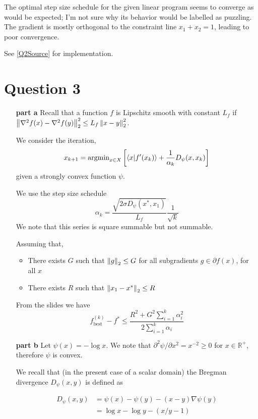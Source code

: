 \documentclass{article}
\begin{document}
The optimal step size schedule for the given linear
program seems to converge as would be expected; I'm not sure why its
behavior would be labelled as puzzling. The gradient is mostly
orthogonal to the constraint line $x_1 + x_2 = 1$, leading to poor
convergence.

See \ref{Q2Source} for implementation.

\section{Question 3}

\begin{enumerate}
\item[\bf part a]
  Recall that a function $f$ is Lipschitz smooth with constant $L_f$
  if $\left\lVert \nabla^2 f(x) - \nabla^2 f(y) \right\rVert_2^2 \le L_f \left\lVert x-y \right\rVert_2^2$.

  We consider the iteration,
  \[ x_{k+1} = \mathrm{argmin}_{x \in X} \left[ \braket{x \vert f'(x_k)} + \frac{1}{\alpha_k}
      D_\psi(x, x_k) \right] \]
  given a strongly convex function $\psi$.

  We use the step size schedule
  \[ \alpha_k = \frac{\sqrt{2 \sigma D_\psi(x^*, x_1)}}{L_f} \frac{1}{\sqrt k} \]
  We note that this series is square summable but not summable.

  Assuming that,

  \begin{itemize}
  \item There exists $G$ such that $\left\lVert g \right\rVert_2 \le G$ for all
    subgradients $g \in \partial f(x)$, for all $x$
  \item There exists $R$ such that $\left\lVert x_1 - x^* \right\rVert_2 \le R$
  \end{itemize}

  From the slides we have
  \[ f_\mathrm{best}^{(k)} - f^* \le \frac{R^2 + G^2 \sum_{i=1}^k \alpha_i^2}{2\sum_{i=1}^k \alpha_i}  \]


\item[\bf part b]
  Let $\psi(x) = - \log x$. We note that $\partial^2\psi / \partial
  x^2 = x^{-2} \ge 0$ for $x \in \mathbb{R}^+$, therefore $\psi$ is
  convex.

  We recall that (in the present case of a scalar domain) the Bregman
  divergence $D_\psi (x,y)$ is defined as

  \begin{align*}
    D_\psi (x,y) & = \psi(x) - \psi(y) - (x-y) \nabla\psi(y) \\
                & = \log x - \log y - (x/y - 1) \\
  \end{align*}


\end{enumerate}
\end{document}

